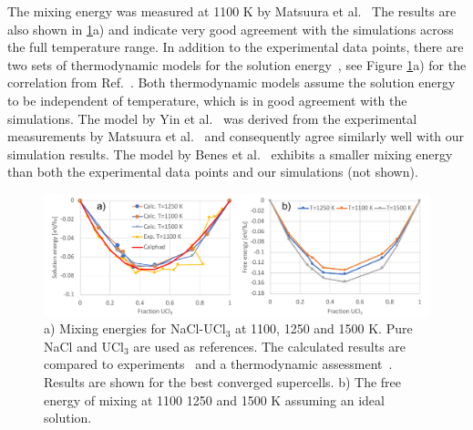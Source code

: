 \documentclass[titlepage=firstiscover,11pt,fleqn,headheight=14pt,footheight=40.8pt]{scrreprt}
\begin{document}
 The mixing energy was measured at 1100 K by Matsuura et al.~\cite{Matsuura} The results are also shown in \ref{fig:NaClUCl3e}a) and indicate very good agreement with the simulations across the full temperature range. In addition to the experimental data points, there are two sets of thermodynamic models for the solution energy~\cite{BENES2008,YIN2020}, see Figure \ref{fig:NaClUCl3e}a) for the correlation from Ref.~\cite{YIN2020}. Both thermodynamic models assume the solution energy to be independent of temperature, which is in good agreement with the simulations. The model by Yin et al.~\cite{YIN2020} was derived from the experimental measurements by Matsuura et al.~\cite{Matsuura} and consequently agree similarly well with our simulation results. The model by Benes et al.~\cite{BENES2008} exhibits a smaller mixing energy than both the experimental data points and our simulations (not shown). 


\begin{figure}[htb]
\centering
\includegraphics[width=1.00\textwidth]{FIG7.pdf}
\caption{a) Mixing energies for NaCl-UCl$_3$ at 1100, 1250 and 1500 K. Pure NaCl and UCl$_3$ are used as references. The calculated results are compared to experiments~\cite{Matsuura} and a thermodynamic assessment~\cite{YIN2020}.%
 Results are shown for the best converged supercells. b) The free energy of mixing at 1100 1250 and 1500 K assuming an ideal solution.} 
\label{fig:NaClUCl3e}
\end{figure}
\end{document}
